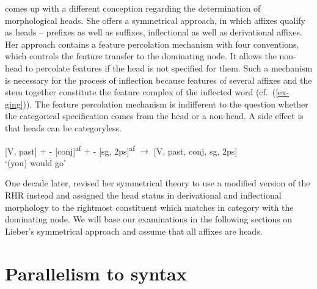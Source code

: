 \documentclass[output=paper
  ,nobabel
  ,draftmode
  ,colorlinks, citecolor=brown
]{langscibook}
\begin{document}
\noindent \citet{Lieber1981} comes up with a different conception regarding the determination of morphological heads. She offers a symmetrical approach, in which affixes qualify as heads – prefixes as well as suffixes, inflectional as well as derivational affixes. Her approach contains a feature percolation mechanism with four conventions, which controls the feature transfer to the dominating node. It allows the non-head to percolate features if the head is not specified for them. Such a mechanism is necessary for the process of inflection because features of several affixes and the stem together constitute the feature complex of the inflected word (cf.\ (\ref{ex-ging})). The feature percolation mechanism is indifferent to the question whether the categorical specification comes from the head or a non-head. A side effect is that heads can be categoryless.

\eanoraggedright
\label{ex-ging}
 [V, past] $+$ - [conj]\textsuperscript{af} $+$ -  [sg, 2ps]\textsuperscript{af} $\rightarrow$   [V, past, conj, sg, 2ps] \\
`(you) would go'
\z

\largerpage[2]
\noindent 
One decade later, \citet{Lieber1992} revised her symmetrical theory to use a modified version of the RHR instead and assigned the head status in derivational and inflectional morphology to the rightmost constituent which matches in category with the dominating node. We will base our examinations in the following sections on Lieber's symmetrical approach and assume that all affixes are heads.


\section{Parallelism to syntax}\label{sec-parallelsyn}
\end{document}

